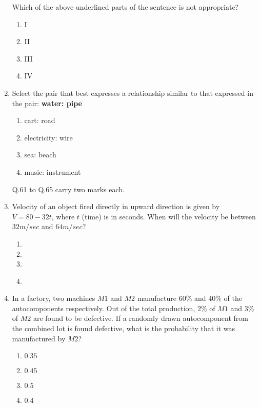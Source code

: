 \documentclass[journal]{IEEEtran}
\newcommand{\questionref}[1]{{ #1}}
\begin{document}
\begin{enumerate}
Which of the above underlined parts of the sentence is not appropriate?

\begin{enumerate}
    \item I
    \item II
    \item III
    \item IV\\
\end{enumerate}

\item \label{Q.60} Select the pair that best expresses a relationship similar to that expressed in the pair: \textbf{water: pipe}

\begin{enumerate}
    \item cart: road
    \item electricity: wire
    \item sea: beach
    \item music: instrument\\
\end{enumerate}

\questionref{Q.61} to \questionref{Q.65} carry two marks each.\\

\item \label{Q.61} Velocity of an object fired directly in upward direction is given by $V = 80 - 32t$, where $t$ (time) is in seconds. When will the velocity be between $32 m/sec$ and $64 m/sec$?

\begin{enumerate}
    \item {}
    \item {}
    \item {}
    \item {}\\
\end{enumerate}

\item \label{Q.62} In a factory, two machines $M1$ and $M2$ manufacture $60\%$ and $40\%$ of the autocomponents respectively. Out of the total production, $2\%$ of $M1$ and $3\%$ of $M2$ are found to be defective. If a randomly drawn autocomponent from the combined lot is found defective, what is the probability that it was manufactured by $M2$?

\begin{enumerate}
    \item $0.35$
    \item $0.45$
    \item $0.5$
    \item $0.4$\\
\end{enumerate}


\end{enumerate}
\end{document}
